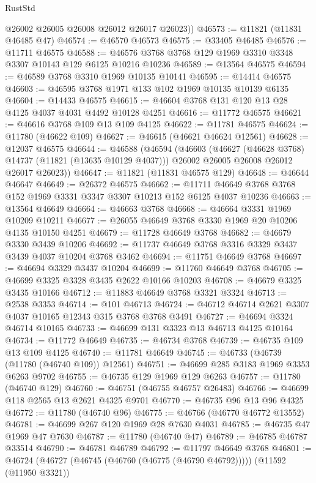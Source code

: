 \begin{lexlean}{RustStd}
\begin{coremodule}
        @26002
        @26005
        @26008
        @26012
        @26017
        @26023))
@46573 := @11821 (@11831 @46485 @47)
@46574 := @46570 @46573
@46575 := @33405 @46485
@46576 := @11711 @46575
@46588 := @46576 @3768 @3768 @129 @1969 @3310 @3348 @3307 @10143 @129 @6125 @10216 @10236
@46589 := @13564 @46575
@46594 := @46589 @3768 @3310 @1969 @10135 @10141
@46595 := @14414 @46575
@46603 := @46595 @3768 @1971 @133 @102 @1969 @10135 @10139 @6135
@46604 := @14433 @46575
@46615 := @46604 @3768 @131 @120 @13 @28 @4125 @4037 @4031 @4492 @10128 @4251
@46616 := @11772 @46575
@46621 := @46616 @3768 @109 @13 @109 @4125
@46622 := @11781 @46575
@46624 := @11780 (@46622 @109)
@46627 := @46615 (@46621 @46624 @12561)
@46628 := @12037 @46575
@46644 := @46588
    (@46594
      (@46603
        (@46627 (@46628 @3768) @14737 (@11821 (@13635 @10129 @4037)))
        @26002
        @26005
        @26008
        @26012
        @26017
        @26023))
@46647 := @11821 (@11831 @46575 @129)
@46648 := @46644 @46647
@46649 := @26372 @46575
@46662 := @11711 @46649 @3768 @3768 @152 @1969 @3331 @3347 @3307 @10213 @152 @6125 @4037 @10236
@46663 := @13564 @46649
@46664 := @46663 @3768
@46668 := @46664 @3331 @1969 @10209 @10211
@46677 := @26055 @46649 @3768 @3330 @1969 @20 @10206 @4135 @10150 @4251
@46679 := @11728 @46649 @3768
@46682 := @46679 @3330 @3439 @10206
@46692 := @11737 @46649 @3768 @3316 @3329 @3437 @3439 @4037 @10204 @3768 @3462
@46694 := @11751 @46649 @3768
@46697 := @46694 @3329 @3437 @10204
@46699 := @11760 @46649 @3768
@46705 := @46699 @3325 @3328 @3435 @2622 @10166 @10203
@46708 := @46679 @3325 @3435 @10166
@46712 := @11883 @46649 @3768 @3321 @3324
@46713 := @2538 @3353
@46714 := @101 @46713
@46724 := @46712 @46714 @2621 @3307 @4037 @10165 @12343 @315 @3768 @3768 @3491
@46727 := @46694 @3324 @46714 @10165
@46733 := @46699 @131 @3323 @13 @46713 @4125 @10164
@46734 := @11772 @46649
@46735 := @46734 @3768
@46739 := @46735 @109 @13 @109 @4125
@46740 := @11781 @46649
@46745 := @46733 (@46739 (@11780 (@46740 @109)) @12561)
@46751 := @46699 @285 @3183 @1969 @3353 @6263 @9702
@46755 := @46735 @129 @1969 @129 @6263
@46757 := @11780 (@46740 @129)
@46760 := @46751 (@46755 @46757 @26483)
@46766 := @46699 @118 @2565 @13 @2621 @4325 @9701
@46770 := @46735 @96 @13 @96 @4325
@46772 := @11780 (@46740 @96)
@46775 := @46766 (@46770 @46772 @13552)
@46781 := @46699 @267 @120 @1969 @28 @7630 @4031
@46785 := @46735 @47 @1969 @47 @7630
@46787 := @11780 (@46740 @47)
@46789 := @46785 @46787 @33514
@46790 := @46781 @46789
@46792 := @11797 @46649 @3768
@46801 := @46724 (@46727 (@46745 (@46760 (@46775 (@46790 @46792))))) (@11592 (@11950 @3321))

\end{coremodule}
\end{lexlean}
